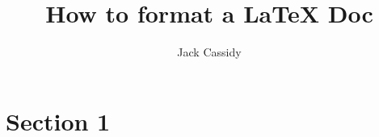 \documentclass{article}
\begin{document}
\title{How to format a LaTeX Doc}
\author{Jack Cassidy}
\maketitle
\section{Section 1}
\end{document}

